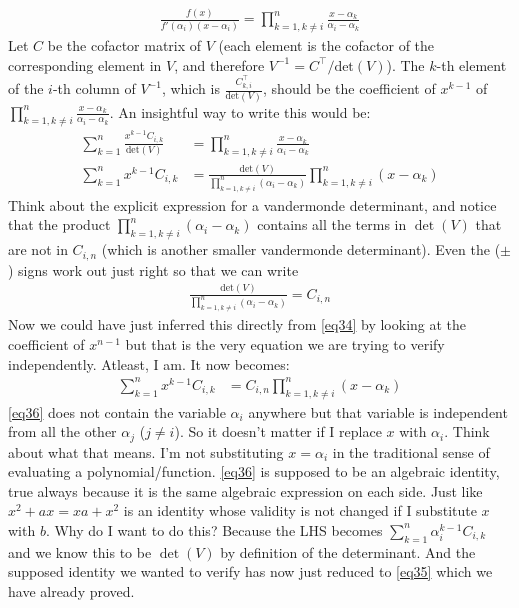 \documentclass{article}
\begin{document}
\begin{align}
    \frac{f(x)}{f'(\alpha_i)(x-\alpha_i)} = \prod_{k=1, k\neq i}^{n} \frac{x-\alpha_k}{\alpha_i - \alpha_k}
\end{align}
\newpage
Let $C$ be the cofactor matrix of $V$ (each element is the cofactor of the corresponding element in $V$, and therefore $V^{-1} = C^\top/\textrm{det}(V)$). The $k$-th element of the $i$-th column of $V^{-1}$, which is $\frac{C^{\top}_{k,i}}{\textrm{det}(V)}$, should be the coefficient of $x^{k-1}$ of $\prod_{k=1, k\neq i}^{n} \frac{x-\alpha_k}{\alpha_i - \alpha_k}$. An insightful way to write this would be:
\begin{align}
    \sum_{k=1}^{n} \frac{x^{k-1} C_{i,k}}{\textrm{det}(V)} &= \prod_{k=1, k\neq i}^{n} \frac{x-\alpha_k}{\alpha_i - \alpha_k} \\
    \sum_{k=1}^{n} x^{k-1} C_{i,k} &= \frac{\textrm{det}(V)}{\prod_{k=1, k\neq i}^{n} (\alpha_i - \alpha_k)} \prod_{k=1, k\neq i}^{n} (x-\alpha_k) \label{eq34}
\end{align}
Think about the explicit expression for a vandermonde determinant, and notice that the product $\prod_{k=1, k\neq i}^{n} (\alpha_i - \alpha_k)$ contains all the terms in $\det(V)$ that are not in $C_{i,n}$ (which is another smaller vandermonde determinant). Even the ($\pm$) signs work out just right so that we can write
\begin{align}
    \frac{\textrm{det}(V)}{\prod_{k=1, k\neq i}^{n} (\alpha_i - \alpha_k)} = C_{i,n} \label{eq35}
\end{align}
Now we could have just inferred this directly from \eqref{eq34} by looking at the coefficient of $x^{n-1}$ but that is the very equation we are trying to verify independently. Atleast, I am. It now becomes:
\begin{align}
    \sum_{k=1}^{n} x^{k-1} C_{i,k} &= C_{i,n} \prod_{k=1, k\neq i}^{n} (x-\alpha_k) \label{eq36}
\end{align}
\eqref{eq36} does not contain the variable $\alpha_i$ anywhere but that variable is independent from all the other $\alpha_j$ ($j\neq i$). So it doesn't matter if I replace $x$ with $\alpha_i$. Think about what that means. I'm not substituting $x=\alpha_i$ in the traditional sense of evaluating a polynomial/function. \eqref{eq36} is supposed to be an algebraic identity, true always because it is the same algebraic expression on each side. Just like $x^2+ax = xa+x^2$ is an identity whose validity is not changed if I substitute $x$ with $b$. Why do I want to do this? Because the LHS becomes $\sum_{k=1}^{n} \alpha_i^{k-1} C_{i,k}$ and we know this to be $\det(V)$ by definition of the determinant. And the supposed identity we wanted to verify has now just reduced to \eqref{eq35} which we have already proved.
\end{document}
